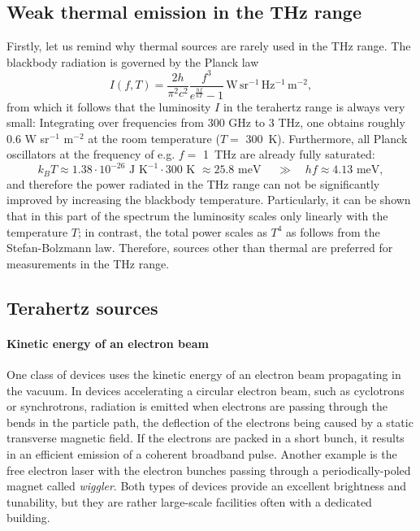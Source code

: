 \subsection{Weak thermal emission in the THz range}%
Firstly, let us remind why thermal sources are rarely used in the THz range. The blackbody radiation is governed by the Planck law %
\begin{equation}I(f, T) = \frac{2 h}{\pi^2 c^2}\frac{f^3}{e^{\frac{h f}{kT}}-1} \mathrm{\,W\,sr^{-1}\,Hz^{-1}\,m^{-2}}, \label{eq_planck}\end{equation}
from which it follows that the luminosity $I$ in the terahertz range is always very small: Integrating over frequencies from 300 GHz to 3 THz, one obtains roughly 0.6 W sr$^{-1}$ m$^{-2}$ at the room temperature ($T=$ 300~K).  Furthermore, all Planck oscillators at the frequency of e.g. $f =$ 1~THz are already fully saturated:
$$k_B T \approx 1.38\cdot 10^{-26} \text{ J K}^{-1} \cdot 300 \text{ K~} \approx 25.8 \text{ meV } \quad\gg\quad h f \approx 4.13 \text{ meV}, $$
and therefore the power radiated in the THz range can not be significantly improved by increasing the blackbody temperature. Particularly, it can be shown that in this part of the spectrum the luminosity scales only linearly with the temperature $T$; in contrast, the total power scales as $T^{4}$ as follows from the Stefan-Bolzmann law. Therefore, sources other than thermal are preferred for measurements in the THz range.
\subsection{Terahertz sources}
\paragraph{Kinetic energy of an electron beam} %
One class of devices uses the kinetic energy of an electron beam propagating in the vacuum. In devices accelerating a circular electron beam, such as cyclotrons or synchrotrons, radiation is emitted when electrons are passing through the bends in the particle path, the deflection of the electrons being caused by a static transverse magnetic field. If the electrons are packed in a short bunch, it results in an efficient emission of a coherent broadband pulse. %
Another example is the free electron laser with the electron bunches %
passing through a periodically-poled magnet called \textit{wiggler}. 
Both types of devices provide an excellent brightness and tunability, but they are rather large-scale facilities often with a dedicated building. 

